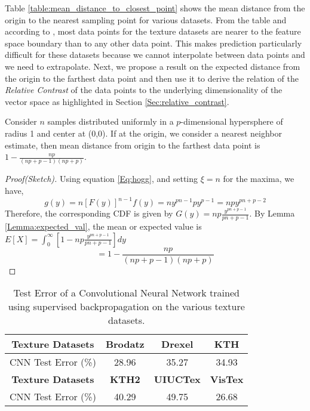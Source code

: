 \documentclass[11pt,a4paper]{article}
\begin{document}
Table \ref{table:mean_distance_to_closest_point} shows the mean distance from the origin to the nearest sampling point for various datasets. From the table and according to \cite{hastie01statisticallearning}, most data points for the texture datasets are nearer to the feature space boundary than to any other data point. This makes prediction particularly difficult for these datasets because we cannot interpolate between data points and we need to extrapolate. Next, we propose a result on the expected distance from the origin to the farthest data point and then use it to derive the relation of the \emph{Relative Contrast} of the data points to the underlying dimensionality of the vector space as highlighted in Section \ref{Sec:relative_contrast}.

\begin{lemma}\label{Lemma:mean_max_seperation}
Consider $n$ samples distributed uniformly in a $p$-dimensional hypersphere of radius 1 and center at (0,0). If at the origin, we consider a nearest neighbor estimate, then mean distance from origin to the farthest data point is $1-\frac{np}{(np+p-1)(np+p)}$.
\end{lemma}

\begin{proof}[Proof(Sketch)] Using equation \ref{Eq:hogg}, and setting $\xi=n$ for the maxima, we have,
\begin{equation}
g(y) = n[F(y)]^{n-1}f(y) = ny^{pn-1}py^{p-1} = npy^{pn+p-2}
\end{equation} 
Therefore, the corresponding CDF is given by $G(y) = np\frac{y^{pn+p-1}}{pn+p-1}$.
By Lemma \ref{Lemma:expected_val}, the mean or expected value is $E[X] = \int_0^{\infty} [1-np\frac{y^{pn+p-1}}{pn+p-1}]dy$
\begin{equation}
= 1 - \frac{np}{(np+p-1)(np+p)}
\end{equation}
\end{proof}

\begin{table*}[ht!]
\centering
\begin{tabular}{ | c | c | c | c  |}
    \hline
     \textbf{Texture Datasets}  & \textbf{Brodatz} & \textbf{Drexel} & \textbf{KTH}\\  \hline
    CNN Test Error (\%) & 28.96 & 35.27 & 34.93 \\ \hline
    \textbf{Texture Datasets}  & \textbf{KTH2} & \textbf{UIUCTex} & \textbf{VisTex}\\  \hline
    CNN Test Error (\%) & 40.29  &  49.75 &  26.68 \\ \hline
  \end{tabular}
  \caption{Test Error of a Convolutional Neural Network trained using supervised backpropagation on the various texture datasets.}
  \label{table:CNN_accuracy_texture}
\end{table*} 
\end{document}
